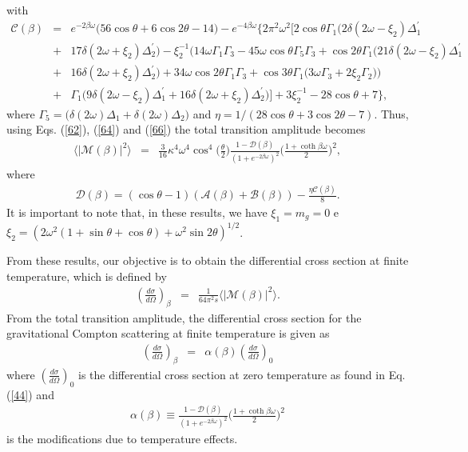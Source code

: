 \documentclass[11pt,showpacs,preprintnumbers,amsmath,amssymb,prd,nofootinbib,superscriptaddress]{revtex4-2}
\newcommand{\bea}{\begin{eqnarray}}
\newcommand{\eea}{\end{eqnarray}}
\begin{document}
with
\begin{eqnarray}
    \mathcal{C}(\beta)&=&e^{-2\beta\omega}\big(56\cos\theta+6\cos2\theta-14\big)-e^{-4\beta\omega}\Big\{2\pi^2\omega^2\Big[2\cos\theta\Gamma_1\big(2\delta(2\omega-\xi_2)\Delta_1^\prime\nonumber\\
    &+&17\delta(2\omega+\xi_2)\Delta_2^\prime\big)-\xi_2^{-1}\Big(14\omega\Gamma_1\Gamma_3-45\omega\cos\theta\Gamma_5\Gamma_3+\cos2\theta\Gamma_1\big(21\delta(2\omega-\xi_2)\Delta_1^\prime\nonumber\\
    &+&16\delta(2\omega+\xi_2)\Delta_2^\prime\big)+34\omega\cos2\theta\Gamma_1\Gamma_3+\cos3\theta\Gamma_1\big(3\omega\Gamma_3+2\xi_2\Gamma_2\big) \Big)\nonumber\\
    &+&\Gamma_1\big(9\delta(2\omega-\xi_2)\Delta_1^\prime+16\delta(2\omega+\xi_2)\Delta_2^\prime\big)\Big]+3\xi_2^{-1}-28\cos\theta+7\Big\},
\end{eqnarray}
where $\Gamma_5=\big(\delta(2\omega)\Delta_1+\delta(2\omega)\Delta_2\big)$ and $\eta=1/(28\cos{\theta}+3\cos{2\theta}-7)$. Thus, using Eqs. (\ref{62}), (\ref{64}) and (\ref{66}) the total transition amplitude becomes
\begin{eqnarray}
     \langle|\mathcal{M}(\beta)|^2\rangle&=&\frac{3}{16}\kappa^4\omega^4\cos^4{\Big(\frac{\theta}{2}\Big)}\frac{1-\mathcal{D}(\beta)}{(1+e^{-2\beta\omega})^2}\bigg(\frac{1+\coth{\beta\omega}}{2}\bigg)^2,
\end{eqnarray}
where
\begin{eqnarray}
    \mathcal{D}(\beta)=(\cos\theta-1)(\mathcal{A}(\beta)+\mathcal{B}(\beta))-\frac{\eta\mathcal{C}(\beta)}{8}.
\end{eqnarray}
It is important to note that, in these results, we have $\xi_1=m_g=0$ e $\xi_2=(2\omega^2(1+\sin{\theta}+\cos{\theta})+\omega^2\sin{2\theta})^{1/2}$. 

From these results, our objective is to obtain the differential cross section at finite temperature, which is defined by
\begin{eqnarray}
     \left(\frac{d\sigma}{d\Omega}\right)_\beta&=&\frac{1}{64\pi^2 s}\langle|\mathcal{M}(\beta)|^2\rangle.
\end{eqnarray}
From the total transition amplitude, the differential cross section for the gravitational Compton scattering at finite temperature is given as
\begin{eqnarray}
     \left(\frac{d\sigma}{d\Omega}\right)_\beta &=&\alpha(\beta) \left(\frac{d\sigma}{d\Omega}\right)_{0}\label{71}
\end{eqnarray}
where $\left(\frac{d\sigma}{d\Omega}\right)_{0}$ is the differential cross section at zero temperature as found in Eq. (\ref{44}) and 
\bea
\alpha(\beta)\equiv\frac{1-\mathcal{D}(\beta)}{(1+e^{-2\beta\omega})^2}\bigg(\frac{1+\coth{\beta\omega}}{2}\bigg)^2
\eea
is the modifications due to temperature effects.
\end{document}
